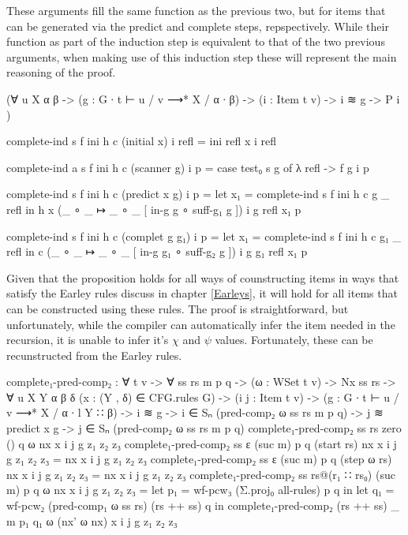 		These arguments fill the same function as the previous two, but for 
		items that can be generated via the predict and complete steps, 
		repspectively. While their function as part of the induction step is 
		equivalent to that of the two previous arguments, when making use of 
		this induction step these will represent the main reasoning of the 
		proof.
		
		\begin{code}
			  (∀ {u X α β} ->
			    (g : G ∙ t ⊢ u / v ⟶* X / α ∙ β) ->
			    (i : Item t v) ->
			    i ≋ g ->
			    P i
			  )

			complete-ind s f ini h c (initial x) i refl =
			  ini refl x i refl
			
			complete-ind {a} s f ini h c (scanner g) i p =
			  case test₀ s g of λ {refl -> f g i p}
			
			complete-ind s f ini h c (predict x g) i p =
			  let x₁ = complete-ind s f ini h c g _ refl in
			  h x (_ ∘ _ ↦ _ ∘ _ [ in-g g ∘ suff-g₁ g ]) i g refl x₁ p
			
			complete-ind s f ini h c (complet g g₁) i p =
			  let x₁ = complete-ind s f ini h c g₁ _ refl in
			  c (_ ∘ _ ↦ _ ∘ _ [ in-g g₁ ∘ suff-g₂ g ]) i g g₁ refl x₁ p
		\end{code}

		Given that the proposition holds for all ways of counstructing items in
		ways that satisfy the Earley rules discuss in chapter \ref{Earleys}, it
		will hold for all items that can be constructed using these rules. The
		proof is straightforward, but unfortunately, while the compiler can
		automatically infer the item needed in the recursion, it is unable to 
		infer it's $\chi$ and $\psi$ values. Fortunately, these can be 
		recunstructed from the Earley rules.

		\begin{code}
			complete₁-pred-comp₂ : ∀ {t v} -> ∀ ss rs m p q ->
			  (ω : WSet t v) ->
			  Nx ss rs ->
			  ∀ {u X Y α β δ}
			  (x : (Y , δ) ∈ CFG.rules G) ->
			  (i j : Item t v) ->
			  (g : G ∙ t ⊢ u / v ⟶* X / α ∙ l Y ∷ β) ->
			  i ≋ g ->
			  i ∈ Sₙ (pred-comp₂ ω ss rs m p q) ->
			  j ≋ predict x g ->
			    j ∈ Sₙ (pred-comp₂ ω ss rs m p q)
			complete₁-pred-comp₂ ss rs            zero    () q ω           nx x i j g z₁ z₂ z₃
			complete₁-pred-comp₂ ss ε             (suc m) p  q (start rs)  nx x i j g z₁ z₂ z₃ =
			  nx x i j g z₁ z₂ z₃
			complete₁-pred-comp₂ ss ε             (suc m) p  q (step ω rs) nx x i j g z₁ z₂ z₃ =
			  nx x i j g z₁ z₂ z₃
			complete₁-pred-comp₂ ss rs@(r₁ ∷ rs₀) (suc m) p  q ω           nx x i j g z₁ z₂ z₃ =
			  let p₁ = wf-pcw₃ (Σ.proj₀ all-rules) p q in
			  let q₁ = wf-pcw₂ (pred-comp₁ ω ss rs) (rs ++ ss) q in
			  complete₁-pred-comp₂ (rs ++ ss) _ m p₁ q₁ ω (nx' ω nx) x i j g z₁ z₂ z₃
		\end{code}

